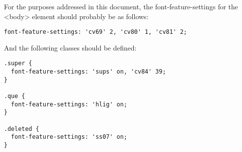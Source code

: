 For the purposes addressed in this document, the font-feature-settings for the <body> element
should probably be as follows:
\begin{verbatim}
font-feature-settings: 'cv69' 2, 'cv80' 1, 'cv81' 2;
\end{verbatim}
\noindent And the following classes should be defined:
\begin{verbatim}
.super {
  font-feature-settings: 'sups' on, 'cv84' 39;
}

.que {
  font-feature-settings: 'hlig' on;
}

.deleted {
  font-feature-settings: 'ss07' on;
}
\end{verbatim}

